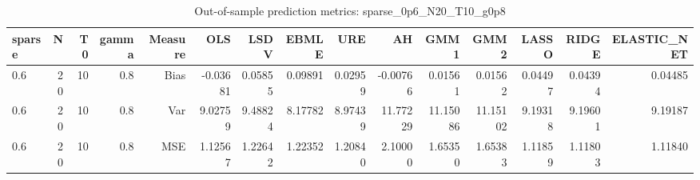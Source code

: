 \begin{table}[!htbp]\centering
\caption{Out-of-sample prediction metrics: sparse_0p6_N20_T10_g0p8}
\label{tab:table3_sparse_0p6_N20_T10_g0p8}
\begin{tabular}{lrrrrrrrrrrrrrr}
\hline
sparse & N & T0 & gamma & Measure & OLS & LSDV & EBMLE & URE & AH & GMM1 & GMM2 & LASSO & RIDGE & ELASTIC_NET \\
\hline
0.6 & 20 & 10 & 0.8 & Bias & -0.03681 & 0.05855 & 0.09891 & 0.02959 & -0.00766 & 0.01561 & 0.01562 & 0.04497 & 0.04394 & 0.04485 \\
0.6 & 20 & 10 & 0.8 & Var & 9.02759 & 9.48824 & 8.17782 & 8.97439 & 11.77229 & 11.15086 & 11.15102 & 9.19318 & 9.19601 & 9.19187 \\
0.6 & 20 & 10 & 0.8 & MSE & 1.12567 & 1.22642 & 1.22352 & 1.20840 & 2.10000 & 1.65350 & 1.65383 & 1.11859 & 1.11803 & 1.11840 \\
\hline
\end{tabular}
\end{table}

